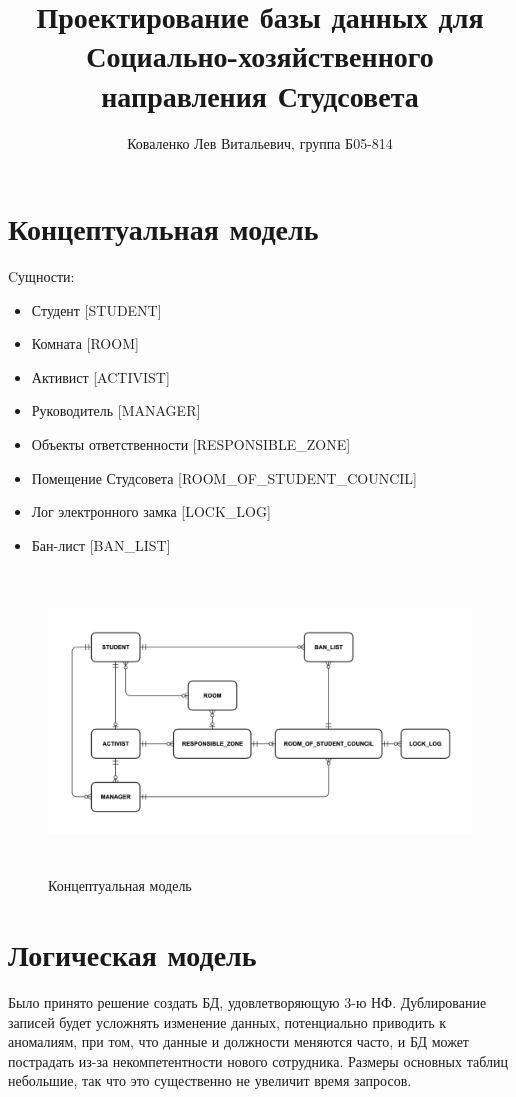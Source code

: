 \documentclass[a4paper,]{article}
\title{Проектирование базы данных для Социально-хозяйственного направления Студсовета}
\author{Коваленко Лев Витальевич, группа Б05-814}
\begin{document}
\maketitle{}

\pagebreak

\section{Концептуальная модель}

\Large{Cущности:}
\begin{itemize}
	\item Студент [STUDENT]
	\item Комната [ROOM]
	\item Активист [ACTIVIST]
	\item Руководитель [MANAGER]
	\item Объекты ответственности [RESPONSIBLE\_ZONE]
	\item Помещение Студсовета [ROOM\_OF\_STUDENT\_COUNCIL]
	\item Лог электронного замка [LOCK\_LOG]
	\item Бан-лист [BAN\_LIST]
\end{itemize}

\begin{figure}[H]
	\centering
	\includegraphics[height=8cm]{media/concept.png}
	\caption{Концептуальная модель}
	\label{figure:concept}
\end{figure}

\pagebreak

\section{Логическая модель}

Было принято решение создать БД, удовлетворяющую 3-ю НФ. Дублирование записей будет усложнять изменение данных, потенциально приводить к аномалиям, при том, что данные и должности меняются часто, и БД может пострадать из-за некомпетентности нового сотрудника. Размеры основных таблиц небольшие, так что это существенно не увеличит время запросов.
\end{document}
